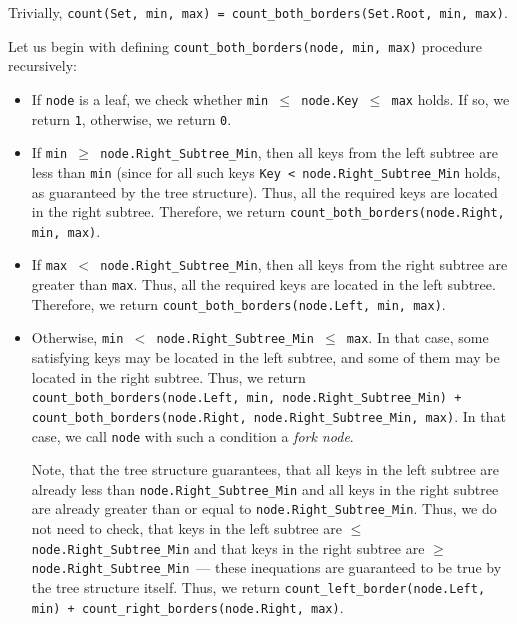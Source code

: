 \documentclass[times, dvipsnames,%
               languages={russian,english} %
              ]{itmo-student-thesis}
\begin{document}
Trivially, \texttt{count(Set, min, max) = count\_both\_borders(Set.Root, min, max)}.

\bigbreak

Let us begin with defining \texttt{count\_both\_borders(node, min, max)} procedure recursively:

\begin{itemize}
    \item If \texttt{node} is a leaf, we check whether \texttt{min $\leq$ node.Key $\leq$ max} holds. If so, we return \texttt{1}, otherwise, we return \texttt{0}.

    \item If \texttt{min $\geq$ node.Right\_Subtree\_Min}, then all keys from the left subtree are less than \texttt{min} (since for all such keys \texttt{Key < node.Right\_Subtree\_Min} holds, as guaranteed by the tree structure). Thus, all the required keys are located in the right subtree. Therefore, we return \texttt{count\_both\_borders(node.Right, min, max)}.
    
    \item If \texttt{max $<$ node.Right\_Subtree\_Min}, then all keys from the right subtree are greater than \texttt{max}. Thus, all the required keys are located in the left subtree. Therefore, we return \texttt{count\_both\_borders(node.Left, min, max)}.
    
    \item Otherwise, \texttt{min $<$ node.Right\_Subtree\_Min $\leq$ max}. In that case, some satisfying keys may be located in the left subtree, and some of them may be located in the right subtree. Thus, we return \texttt{count\_both\_borders(node.Left, min, node.Right\_Subtree\_Min) + count\_both\_borders(node.Right, node.Right\_Subtree\_Min, max)}. In that case, we call \texttt{node} with such a condition a \emph{fork node}.
    
    Note, that the tree structure guarantees, that all keys in the left subtree are already less than \texttt{node.Right\_Subtree\_Min} and all keys in the right subtree are already greater than or equal to \texttt{node.Right\_Subtree\_Min}. Thus, we do not need to check, that keys in the left subtree are $\leq$ \texttt{node.Right\_Subtree\_Min} and that keys in the right subtree are $\geq$ \texttt{node.Right\_Subtree\_Min}~--- these inequations are guaranteed to be true by the tree structure itself. Thus, we return \texttt{count\_left\_border(node.Left, min) + count\_right\_borders(node.Right, max)}.
\end{itemize}
\end{document}
